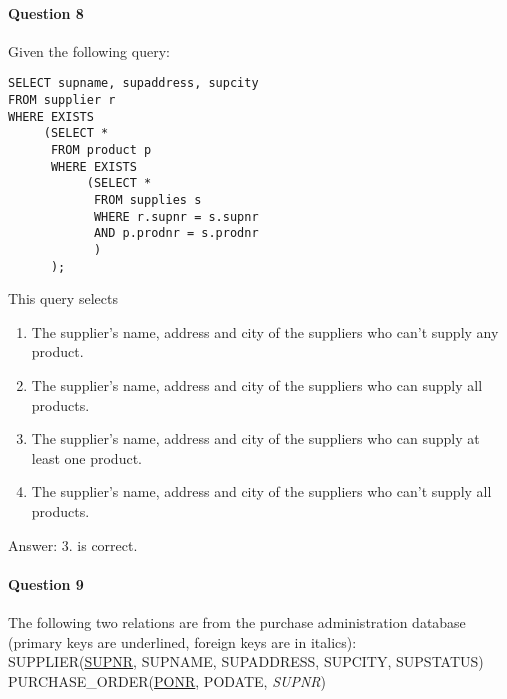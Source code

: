 \documentclass[10pt,a4paper]{report}
\begin{document}
\paragraph{Question 8}
Given the following query:
\begin{verbatim}
SELECT supname, supaddress, supcity
FROM supplier r
WHERE EXISTS
     (SELECT *
      FROM product p
      WHERE EXISTS 
           (SELECT *
            FROM supplies s
            WHERE r.supnr = s.supnr
            AND p.prodnr = s.prodnr
            )
      );
\end{verbatim}
This query selects 
\begin{enumerate}
\item The supplier's name, address and city of the suppliers who can't supply any product.
\item The supplier's name, address and city of the suppliers who can supply all products.
\item The supplier's name, address and city of the suppliers who can supply at least one product.
\item The supplier's name, address and city of the suppliers who can't supply all products.
\end{enumerate}
Answer: 3. is correct. 
 
\paragraph{Question 9}
The following two relations are from the purchase administration database (primary keys are underlined, foreign keys are in italics):\\
SUPPLIER(\underline{SUPNR}, SUPNAME, SUPADDRESS, SUPCITY, SUPSTATUS)\\
PURCHASE\_ORDER(\underline{PONR}, PODATE, \textit{SUPNR})\\
\end{document}

